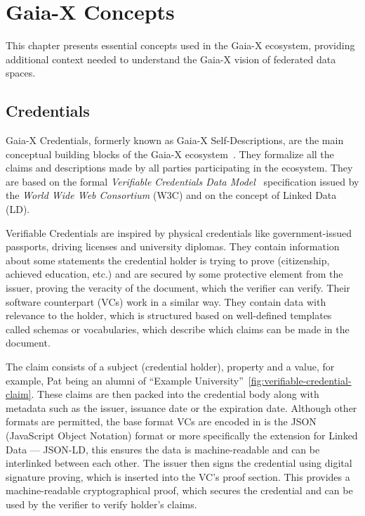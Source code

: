 \chapter{Gaia-X Concepts}\label{ch:gaia-x-concepts}

\begin{chapterabstract}
    This chapter presents essential concepts used in the Gaia-X ecosystem, providing additional context needed to understand the Gaia-X vision of federated data spaces.
\end{chapterabstract}

\section{Credentials}\label{sec:credentials}

Gaia-X Credentials, formerly known as Gaia-X Self-Descriptions, are the main conceptual building blocks of the Gaia-X ecosystem~\cite{gaiax_architecture_document}.
They formalize all the claims and descriptions made by all parties participating in the ecosystem.
They are based on the formal \textit{Verifiable Credentials Data Model}~\cite{verifiable_credentials} specification issued by the \textit{World Wide Web Consortium} (W3C) and on the concept of Linked Data (LD).

Verifiable Credentials are inspired by physical credentials like government-issued passports, driving licenses and university diplomas.
They contain information about some statements the credential holder is trying to prove (citizenship, achieved education, etc.) and are secured by some protective element from the issuer, proving the veracity of the document, which the verifier can verify.
Their software counterpart (VCs) work in a similar way.
They contain data with relevance to the holder, which is structured based on well-defined templates called schemas or vocabularies, which describe which claims can be made in the document.

The claim consists of a subject (credential holder), property and a value, for example, Pat being an alumni of ``Example University''~\ref{fig:verifiable-credential-claim}.
These claims are then packed into the credential body along with metadata such as the issuer, issuance date or the expiration date.
Although other formats are permitted, the base format VCs are encoded in is the JSON (JavaScript Object Notation) format or more specifically the extension for Linked Data --- JSON-LD, this ensures the data is machine-readable and can be interlinked between each other.
The issuer then signs the credential using digital signature proving, which is inserted into the VC's proof section.
This provides a machine-readable cryptographical proof, which secures the credential and can be used by the verifier to verify holder's claims.


